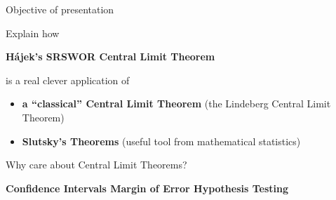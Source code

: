 
\begin{frame}{\Huge Objective of presentation}

\vskip -0.5cm

Explain how

\vskip 0.6cm

\begin{center}
\textbf{\LARGE H\'{a}jek's SRSWOR Central Limit Theorem}
\end{center}

\vskip 0.1cm

is a real clever application of

\vskip 0.3cm

\begin{itemize}
\item	\textbf{\LARGE a ``classical'' Central Limit Theorem}
		\vskip 0.05cm
		{\small(the Lindeberg Central Limit Theorem)}
		\vskip 0.6cm
\item	\textbf{\LARGE Slutsky's Theorems}
		\vskip 0.05cm
		{\small(useful tool from mathematical statistics)}
\end{itemize}

\end{frame}
\normalsize

\begin{frame}{\LARGE Why care about Central Limit Theorems?}

\begin{center}
\textbf{\Huge
Confidence Intervals
\vskip 1.0cm
Margin of Error
\vskip 1.0cm
Hypothesis Testing
}
\end{center}

\end{frame}
\normalsize

